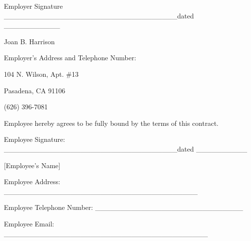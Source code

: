 \documentclass[]{article}
\begin{document}
Employer Signature
\_\_\_\_\_\_\_\_\_\_\_\_\_\_\_\_\_\_\_\_\_\_\_\_\_\_\_\_\_\_\_\_\_\_dated
\_\_\_\_\_\_\_\_\_\_\_

Joan B. Harrison

Employer's Address and Telephone Number:

104 N. Wilson, Apt. \#13

Pasadena, CA 91106

(626) 396-7081

Employee hereby agrees to be fully bound by the terms of this contract.

Employee Signature:
\_\_\_\_\_\_\_\_\_\_\_\_\_\_\_\_\_\_\_\_\_\_\_\_\_\_\_\_\_\_\_\_\_\_dated
\_\_\_\_\_\_\_\_\_\_

{[}Employee's Name{]}

Employee Address:
\_\_\_\_\_\_\_\_\_\_\_\_\_\_\_\_\_\_\_\_\_\_\_\_\_\_\_\_\_\_\_\_\_\_\_\_\_\_

Employee Telephone Number:
\_\_\_\_\_\_\_\_\_\_\_\_\_\_\_\_\_\_\_\_\_\_\_\_\_\_\_\_\_

Employee Email:
\_\_\_\_\_\_\_\_\_\_\_\_\_\_\_\_\_\_\_\_\_\_\_\_\_\_\_\_\_\_\_\_\_\_\_\_\_\_\_\_
\end{document}
